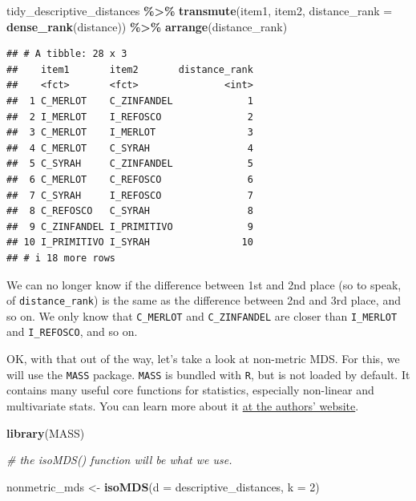 \documentclass[
]{book}
\newenvironment{Shaded}{\begin{snugshade}}{\end{snugshade}}
\newcommand{\AttributeTok}[1]{\textcolor[rgb]{0.13,0.29,0.53}{#1}}
\newcommand{\CommentTok}[1]{\textcolor[rgb]{0.56,0.35,0.01}{\textit{#1}}}
\newcommand{\DecValTok}[1]{\textcolor[rgb]{0.00,0.00,0.81}{#1}}
\newcommand{\FunctionTok}[1]{\textcolor[rgb]{0.13,0.29,0.53}{\textbf{#1}}}
\newcommand{\NormalTok}[1]{#1}
\newcommand{\OtherTok}[1]{\textcolor[rgb]{0.56,0.35,0.01}{#1}}
\newcommand{\SpecialCharTok}[1]{\textcolor[rgb]{0.81,0.36,0.00}{\textbf{#1}}}
\begin{document}
\begin{Shaded}
\begin{Highlighting}[]
\NormalTok{tidy\_descriptive\_distances }\SpecialCharTok{\%\textgreater{}\%}
  \FunctionTok{transmute}\NormalTok{(item1, item2, }
            \AttributeTok{distance\_rank =} \FunctionTok{dense\_rank}\NormalTok{(distance)) }\SpecialCharTok{\%\textgreater{}\%}
  \FunctionTok{arrange}\NormalTok{(distance\_rank)}
\end{Highlighting}
\end{Shaded}

\begin{verbatim}
## # A tibble: 28 x 3
##    item1       item2       distance_rank
##    <fct>       <fct>               <int>
##  1 C_MERLOT    C_ZINFANDEL             1
##  2 I_MERLOT    I_REFOSCO               2
##  3 C_MERLOT    I_MERLOT                3
##  4 C_MERLOT    C_SYRAH                 4
##  5 C_SYRAH     C_ZINFANDEL             5
##  6 C_MERLOT    C_REFOSCO               6
##  7 C_SYRAH     I_REFOSCO               7
##  8 C_REFOSCO   C_SYRAH                 8
##  9 C_ZINFANDEL I_PRIMITIVO             9
## 10 I_PRIMITIVO I_SYRAH                10
## # i 18 more rows
\end{verbatim}

We can no longer know if the difference between 1st and 2nd place (so to speak, of \texttt{distance\_rank}) is the same as the difference between 2nd and 3rd place, and so on. We only know that \texttt{C\_MERLOT} and \texttt{C\_ZINFANDEL} are closer than \texttt{I\_MERLOT} and \texttt{I\_REFOSCO}, and so on.

OK, with that out of the way, let's take a look at non-metric MDS. For this, we will use the \texttt{MASS} package. \texttt{MASS} is bundled with \texttt{R}, but is not loaded by default. It contains many useful core functions for statistics, especially non-linear and multivariate stats. You can learn more about it \href{https://www.stats.ox.ac.uk/pub/MASS4/}{at the authors' website}.

\begin{Shaded}
\begin{Highlighting}[]
\FunctionTok{library}\NormalTok{(MASS)}

\CommentTok{\# the \textasciigrave{}isoMDS()\textasciigrave{} function will be what we use.}

\NormalTok{nonmetric\_mds }\OtherTok{\textless{}{-}}
  \FunctionTok{isoMDS}\NormalTok{(}\AttributeTok{d =}\NormalTok{ descriptive\_distances, }\AttributeTok{k =} \DecValTok{2}\NormalTok{)}
\end{Highlighting}
\end{Shaded}
\end{document}
